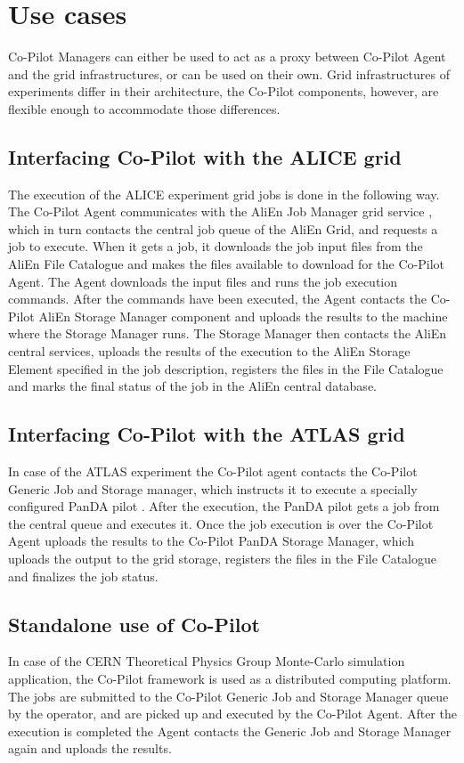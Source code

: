 \chapter{Use cases}
\label{sct:usecases}


Co-Pilot Managers can either be used to act as a proxy between Co-Pilot Agent and the grid infrastructures, or can be used on their own. Grid infrastructures of experiments differ in their architecture, the Co-Pilot components, however, are flexible enough to accommodate those differences. 

\section{Interfacing Co-Pilot with the ALICE grid}

The execution of the ALICE experiment grid jobs is done in the following way. The Co-Pilot Agent communicates with the AliEn Job Manager grid service \cite{alien}, which in turn contacts the central job queue of the AliEn Grid, and requests a job to execute. When it gets a job, it downloads the job input files from the AliEn File Catalogue and makes the files available to download for the Co-Pilot Agent. The Agent downloads the input files and runs the job execution commands. After the commands have been executed, the Agent contacts the Co-Pilot AliEn Storage Manager component and uploads the results to the machine where the Storage Manager runs. The Storage Manager then contacts the AliEn central services, uploads the results of the execution to the AliEn Storage Element specified in the job description, registers the files in the File Catalogue and marks the final status of the job in the AliEn central database.

\section{Interfacing Co-Pilot with the ATLAS grid}
In case of the ATLAS experiment the Co-Pilot agent contacts the Co-Pilot Generic Job and Storage manager, which instructs it to execute a specially configured PanDA pilot \cite{panda}. After the execution, the PanDA pilot gets a job from the central queue and executes it. Once the job execution is over the Co-Pilot Agent uploads the results to the Co-Pilot PanDA Storage Manager, which uploads the output to the grid storage, registers the files in the File Catalogue and finalizes the job status. 

\section{Standalone use of Co-Pilot}
In case of the CERN Theoretical Physics Group Monte-Carlo simulation application, the Co-Pilot framework is used as a distributed computing platform. The jobs are submitted to the Co-Pilot Generic Job and Storage Manager queue by the operator, and are picked up and executed by the Co-Pilot Agent. After the execution is completed the Agent contacts the Generic Job and Storage Manager again and uploads the results.
